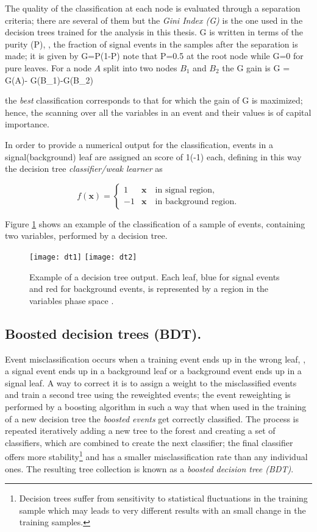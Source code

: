 The quality of the classification at each node is evaluated through a separation criteria; there are several of them but the \textit{Gini Index (G)} is the one used in the decision trees trained for the analysis in this thesis. G is written in terms of the purity (P), \ie, the fraction of signal events in the samples after the separation is made; it is given by
\beqn
G=P(1-P)
\eeqn
\noindent note that P=0.5 at the root node while G=0 for pure leaves. For a node $A$ split into two nodes $B_1$ and $B_2$ the G gain is
\beqn
\Delta G = G(A)- G(B_1)-G(B_2)
\eeqn

\noindent the \textit{best} classification corresponds to that for which the gain of G is maximized; hence, the scanning over all the variables in an event and their values is of capital importance.

In order to provide a numerical output for the classification, events in a signal(background) leaf are assigned an score of 1(-1) each, defining in this way the decision tree \textit{classifier/weak learner} as

\[
f(\textbf{x}) = \left\{
\begin{array}{ll}
  1  &  \textbf{x} \quad \textrm{in signal region,}\\
  -1 &  \textbf{x} \quad \textrm{in background region.}
\end{array}
\right.
\]

Figure \ref{fig:dtr} shows an example of the classification of a sample of events, containing two variables, performed by a decision tree.

\begin{figure}[!h]
  \centering
  \texttt{[image: dt1]}
  \texttt{[image: dt2]}
  \caption[Decision tree output example.]{Example of a decision tree output. Each leaf, blue for signal events and red for background events, is represented by a region in the variables phase space \cite{coadou}.}\label{fig:dtr}
\end{figure}

\subsection{Boosted decision trees (BDT).}

Event misclassification occurs when a training event ends up in the wrong leaf, \ie, a signal event ends up in a background leaf or a background event ends up in a signal leaf. A way to correct it is to assign a weight to the misclassified events and train a second tree using the reweighted events; the event reweighting is performed by a boosting algorithm in such a way that when used in the training of a new decision tree  the \textit{boosted events} get correctly classified. The process is repeated iteratively adding a new tree to the forest and creating a set of classifiers, which are combined to create the next classifier; the final classifier offers more stability\footnote{Decision trees suffer from sensitivity to statistical fluctuations in the training sample which may leads to very different results with an small change in the training samples.} and has a smaller misclassification rate than any individual ones. The resulting tree collection is known as a \textit{boosted decision tree (BDT)}.

